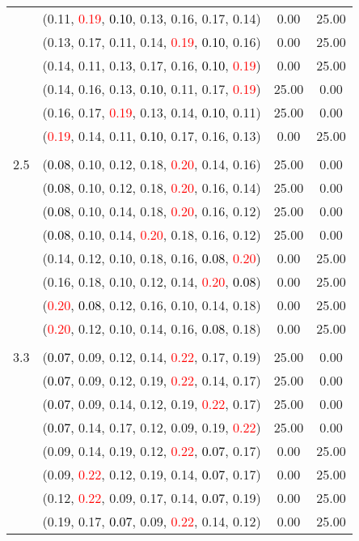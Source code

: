 \documentclass[10pt,a4paper]{report}
\begin{document}
\begin{center}
\begin{longtable}{clcc}
			&(0.11, \textcolor{red}{0.19}, \textcolor{black}{0.10}, 0.13, 0.16, 0.17, 0.14)&0.00&25.00\\
			&(0.13, 0.17, 0.11, 0.14, \textcolor{red}{0.19}, \textcolor{black}{0.10}, 0.16)&0.00&25.00\\
			&(0.14, 0.11, 0.13, 0.17, 0.16, \textcolor{black}{0.10}, \textcolor{red}{0.19})&0.00&25.00\\
			&(0.14, 0.16, 0.13, \textcolor{black}{0.10}, 0.11, 0.17, \textcolor{red}{0.19})&25.00&0.00\\
			&(0.16, 0.17, \textcolor{red}{0.19}, 0.13, 0.14, \textcolor{black}{0.10}, 0.11)&25.00&0.00\\
			&(\textcolor{red}{0.19}, 0.14, 0.11, \textcolor{black}{0.10}, 0.17, 0.16, 0.13)&0.00&25.00\\
		&&&\\
		2.5			&(\textcolor{black}{0.08}, 0.10, 0.12, 0.18, \textcolor{red}{0.20}, 0.14, 0.16)&25.00&0.00\\
			&(\textcolor{black}{0.08}, 0.10, 0.12, 0.18, \textcolor{red}{0.20}, 0.16, 0.14)&25.00&0.00\\
			&(\textcolor{black}{0.08}, 0.10, 0.14, 0.18, \textcolor{red}{0.20}, 0.16, 0.12)&25.00&0.00\\
			&(\textcolor{black}{0.08}, 0.10, 0.14, \textcolor{red}{0.20}, 0.18, 0.16, 0.12)&25.00&0.00\\
			&(0.14, 0.12, 0.10, 0.18, 0.16, \textcolor{black}{0.08}, \textcolor{red}{0.20})&0.00&25.00\\
			&(0.16, 0.18, 0.10, 0.12, 0.14, \textcolor{red}{0.20}, \textcolor{black}{0.08})&0.00&25.00\\
			&(\textcolor{red}{0.20}, \textcolor{black}{0.08}, 0.12, 0.16, 0.10, 0.14, 0.18)&0.00&25.00\\
			&(\textcolor{red}{0.20}, 0.12, 0.10, 0.14, 0.16, \textcolor{black}{0.08}, 0.18)&0.00&25.00\\
		&&&\\
		3.3			&(\textcolor{black}{0.07}, 0.09, 0.12, 0.14, \textcolor{red}{0.22}, 0.17, 0.19)&25.00&0.00\\
			&(\textcolor{black}{0.07}, 0.09, 0.12, 0.19, \textcolor{red}{0.22}, 0.14, 0.17)&25.00&0.00\\
			&(\textcolor{black}{0.07}, 0.09, 0.14, 0.12, 0.19, \textcolor{red}{0.22}, 0.17)&25.00&0.00\\
			&(\textcolor{black}{0.07}, 0.14, 0.17, 0.12, 0.09, 0.19, \textcolor{red}{0.22})&25.00&0.00\\
			&(0.09, 0.14, 0.19, 0.12, \textcolor{red}{0.22}, \textcolor{black}{0.07}, 0.17)&0.00&25.00\\
			&(0.09, \textcolor{red}{0.22}, 0.12, 0.19, 0.14, \textcolor{black}{0.07}, 0.17)&0.00&25.00\\
			&(0.12, \textcolor{red}{0.22}, 0.09, 0.17, 0.14, \textcolor{black}{0.07}, 0.19)&0.00&25.00\\
			&(0.19, 0.17, \textcolor{black}{0.07}, 0.09, \textcolor{red}{0.22}, 0.14, 0.12)&0.00&25.00\\
		\bottomrule
	\end{longtable}
\end{center}
\end{document}

